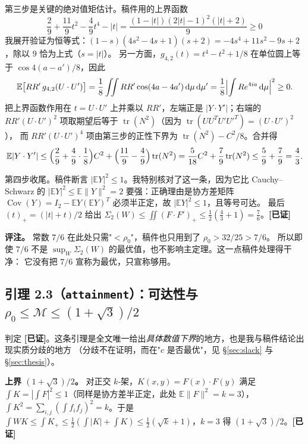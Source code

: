 \documentclass[UTF8,11pt]{ctexart}
\theoremstyle{definition}
\newcommand{\tr}{\operatorname{tr}}
\newcommand{\dd}{\,\mathrm{d}}
\newcommand{\E}{\mathbb{E}}
\newcommand{\ok}{\textcolor[rgb]{0.05,0.45,0.15}{\bfseries [已证]}}
\begin{document}
第三步是关键的绝对值矩估计。稿件用的上界函数
\[
 \frac29+\frac{11}{9}t^2-\frac49t^4-|t|=\frac{(1-|t|)(2|t|-1)^2(|t|+2)}9\ge0
\]
我展开验证为恒等式：$(1-s)(4s^2-4s+1)(s+2)=-4s^4+11s^2-9s+2$，除以 $9$ 恰为上式（$s=|t|$）。
另一方面，$g_{4,2}(t)=t^4-t^2+1/8$ 在单位圆上等于 $\cos 4(a-a')/8$，因此
\[
 \E\bigl[RR'\,g_{4,2}(U\cdot U')\bigr]
   =\frac18\iint RR'\cos(4a-4a')\dd\mu\dd\mu'
   =\frac18\Bigl|\int R e^{4ia}\dd\mu\Bigr|^2\ge0 .
\]
把上界函数作用在 $t=U\cdot U'$ 上并乘以 $RR'$，左端正是 $|Y\cdot Y'|$；右端的
$RR'(U\cdot U')^2$ 项取期望后等于 $\tr(N^2)$（因为 $\tr(UU^TU'U'^T)=(U\cdot U')^2$），
而 $RR'(U\cdot U')^4$ 项由第三步的正性下界为 $\tr(N^2)-C^2/8$。合并得
\[
 \E|Y\cdot Y'|\le\Bigl(\frac29+\frac49\cdot\frac18\Bigr)C^2
              +\Bigl(\frac{11}9-\frac49\Bigr)\tr(N^2)
              =\frac5{18}C^2+\frac79\tr(N^2)\le\frac59+\frac79=\frac43 .
\]

第四步收尾。稿件断言 $|\E Y|^2\le1$。我特别核对了这一条，因为它比 Cauchy--Schwarz 的
$|\E Y|^2\le\E\|Y\|^2=2$ 要强：正确理由是协方差矩阵
$\operatorname{Cov}(Y)=I_2-\E Y(\E Y)^T$ 必须半正定，故 $|\E Y|^2\le1$，且等号可达。
最后 $(t)_+=(|t|+t)/2$ 给出
$\Sigma_2(W)\le\iint(F\cdot F')_+\le\frac12(\frac43+1)=\frac76$。\hfill\ok

\textbf{评注。} 常数 $7/6$ 在此处只需"$<\rho_0$"，稿件也只用到了 $\rho_0>32/25>7/6$。
所以即使 $7/6$ 不是 $\sup_W\Sigma_2(W)$ 的最优值，也不影响主定理。这一点稿件处理得干净：
它没有把 $7/6$ 宣称为最优，只宣称够用。

\subsection{引理 2.3（\texttt{attainment}）：可达性与 $\rho_0\le\mathcal M\le(1+\sqrt3)/2$}

判定 \ok。这条引理是全文唯一给出\emph{具体数值下界}的地方，也是我与稿件结论出现实质分歧的地方
（分歧不在证明，而在"$c$ 是否最优"，见 \S\ref{sec:slack} 与 \S\ref{sec:thesis}）。

\textbf{上界 $(1+\sqrt3)/2$。} 对正交 $k$-架，$K(x,y)=F(x)\cdot F(y)$ 满足
$\int K=|\int F|^2\le1$（同样是协方差半正定，此处 $\E\|F\|^2=k=3$），
$\int K^2=\sum_{i,j}(\int f_if_j)^2=k$。于是
$\int WK\le\int K_+\le\frac12(\int|K|+\int K)\le\frac12(\sqrt k+1)$，$k=3$ 得 $(1+\sqrt3)/2$。\hfill\ok
\end{document}
